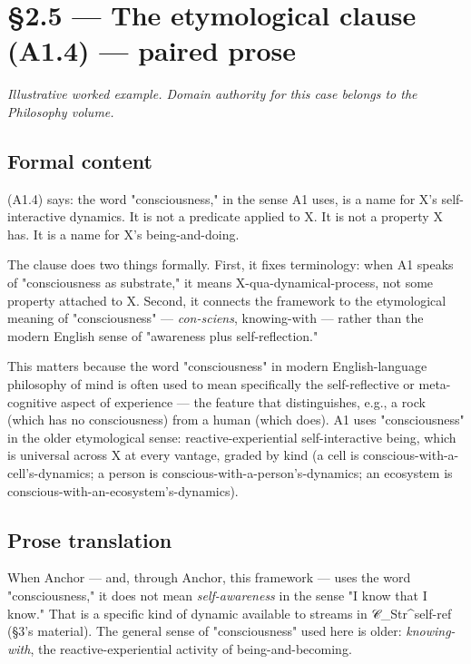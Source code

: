 \documentclass[11pt, openany]{book}
\newcommand{\sectionbreak}{\clearpage}
\begin{document}
\sectionbreak

\section{§2.5 --- The etymological clause (A1.4) --- paired prose}

\textit{Illustrative worked example. Domain authority for this case belongs to the Philosophy volume.}

\subsection{Formal content}

(A1.4) says: the word "consciousness," in the sense A1 uses, is a name for X's self-interactive dynamics. It is not a predicate applied to X. It is not a property X has. It is a name for X's being-and-doing.

The clause does two things formally. First, it fixes terminology: when A1 speaks of "consciousness as substrate," it means X-qua-dynamical-process, not some property attached to X. Second, it connects the framework to the etymological meaning of "consciousness" --- \textit{con-sciens}, knowing-with --- rather than the modern English sense of "awareness plus self-reflection."

This matters because the word "consciousness" in modern English-language philosophy of mind is often used to mean specifically the self-reflective or meta-cognitive aspect of experience --- the feature that distinguishes, e.g., a rock (which has no consciousness) from a human (which does). A1 uses "consciousness" in the older etymological sense: reactive-experiential self-interactive being, which is universal across X at every vantage, graded by kind (a cell is conscious-with-a-cell's-dynamics; a person is conscious-with-a-person's-dynamics; an ecosystem is conscious-with-an-ecosystem's-dynamics).

\subsection{Prose translation}

When Anchor --- and, through Anchor, this framework --- uses the word "consciousness," it does not mean \textit{self-awareness} in the sense "I know that I know." That is a specific kind of dynamic available to streams in 𝒞\_\allowbreak{}Str\textasciicircum{}self-ref (§3's material). The general sense of "consciousness" used here is older: \textit{knowing-with}, the reactive-experiential activity of being-and-becoming.
\end{document}
